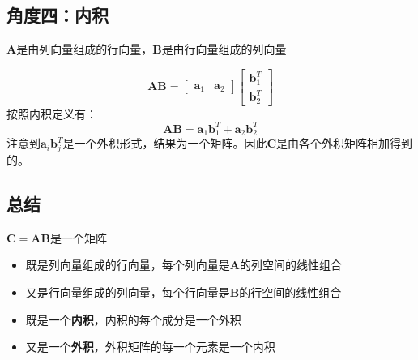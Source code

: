 \subsection{角度四：内积}

$\bm{A}$是由列向量组成的行向量，$\bm{B}$是由行向量组成的列向量

$$\bm{A B}=\left[\begin{array}{ll}\bm{a}_{1} & \bm{a}_{2}\end{array}\right]\left[\begin{array}{l}\bm{b}_{1}^{T} \\ \bm{b}_{2}^{T}\end{array}\right]$$
按照内积定义有：
$$\bm{A B}=\bm{a}_{1} \bm{b}_{1}^{T}+\bm{a}_{2} \bm{b}_{2}^{T}$$
注意到$\bm{a}_{i} \bm{b}_{j}^{T}$是一个外积形式，结果为一个矩阵。因此$\bm{C}$是由各个外积矩阵相加得到的。

\subsection{总结}

$\bm{C=AB}$是一个矩阵
\begin{itemize}
    \item 既是列向量组成的行向量，每个列向量是$\bm{A}$的列空间的线性组合
    \item 又是行向量组成的列向量，每个行向量是$\bm{B}$的行空间的线性组合
    \item 既是一个\textbf{内积}，内积的每个成分是一个外积
    \item 又是一个\textbf{外积}，外积矩阵的每一个元素是一个内积
\end{itemize}
